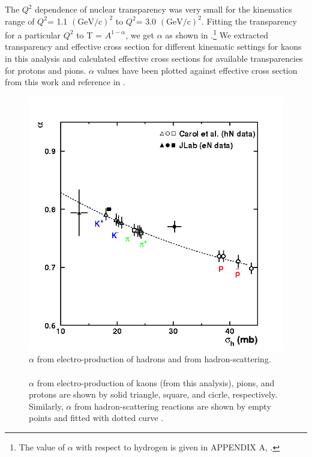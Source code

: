 The $Q^2$ dependence of nuclear transparency was very small for the kinematics range of $Q^2$= 1.1 $(\mathrm{GeV/c})^2$ to $Q^2$= 3.0 $(\mathrm{GeV/c})^2$. Fitting the transparency for a particular $Q^2$ to T = $A^{1-\alpha}$, we get $\alpha$ as shown in .\footnote{The value of $\alpha$ with respect to hydrogen is given in APPENDIX A, .} We extracted transparency and effective cross section for different kinematic settings for kaons in this analysis and calculated effective cross sections for available transparencies for protons and pions. $\alpha$ values have been plotted against effective cross section from this work and reference \cite{jlabp2} in .

\begin{figure}[!tbp]
  \centering
  \includegraphics[width=0.8\columnwidth]{carolplot}
  \caption[$\alpha$ from electro-production of hadrons and from hadron-scattering.]{\label{fig:carolplot}$\alpha$ from electro-production of hadrons and from hadron-scattering.\\\\ $\alpha$ from electro-production of kaons (from this analysis), pions, and protons are shown by solid triangle, square, and cicrle, respectively. Similarly, $\alpha$ from hadron-scattering reactions are shown by empty points and fitted with dotted curve \cite{carroll}.}
\end{figure}

